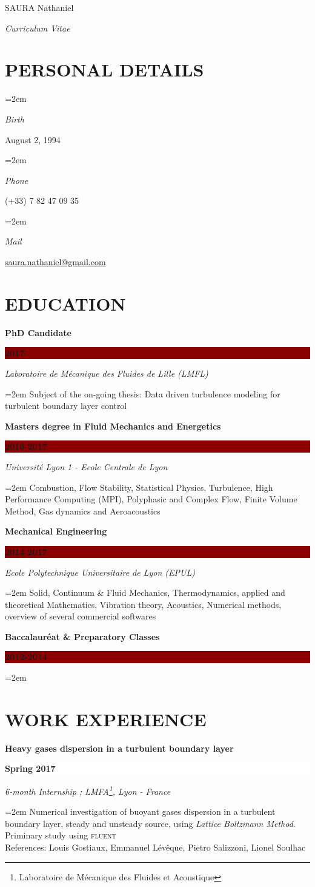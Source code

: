 \documentclass[paper=a4,fontsize=10pt]{scrartcl} %
\newcommand{\dred}{\color{dred}}
\newcommand{\bk}{\color{black}}
\newlength{\spacebox}
\newcommand{\sepspace}{\vspace*{1em}}		%
\newcommand{\MyName}[1]{ %
		\Huge \usefont{OT1}{phv}{b}{n} \hfill #1
		\par \normalsize \normalfont}
\newcommand{\MySlogan}[1]{ %
		\large \usefont{OT1}{phv}{m}{n}\hfill \textit{#1}
		\par \normalsize \normalfont}
\newcommand{\NewPart}[1]{\section*{\uppercase{#1}}}
\newcommand{\PersonalEntry}[2]{
		\noindent\hangindent=2em\hangafter=0 %
		\parbox{\spacebox}{        %
		\textit{#1}}		       %
		\hspace{1.5em} #2 \par}    %
\newcommand{\EducationEntry}[4]{
		\noindent \textbf{#1} \hfill      %
		\colorbox{DarkRed}{%
			\parbox{6em}{%
			\hfill\color{White}#2}} \par  %
		\noindent \textit{#3} \par        %
		\noindent\hangindent=2em\hangafter=0 \small #4 %
		\normalsize \par}
\newcommand{\EducationEntrie}[4]{
		\noindent \textbf{#1} \hfill      %
		\colorbox{white}{%
			\parbox{10em}{%
			\hfill\dred#2 }} \par  %
		\noindent \textit{#3} \par        %
		\noindent\hangindent=2em\hangafter=0 \small #4 %
		\normalsize \par}
\begin{document}

\MyName{\dred SAURA \bk Nathaniel}
\MySlogan{Curriculum \dred Vitae \bk}


\NewPart{Personal details}{} \bk

\PersonalEntry{Birth}{August 2, 1994}
\PersonalEntry{Phone}{(+33) 7 82 47 09 35}
\PersonalEntry{Mail}{\href{mailto:saura.nathaniel@gmail.com}{saura.nathaniel@gmail.com}} \bk

\NewPart{Education}{}
\EducationEntry{PhD Candidate}{\textbf{2017-}}{Laboratoire de Mécanique des Fluides de Lille (LMFL)}{Subject of the on-going thesis: Data driven turbulence modeling for turbulent boundary layer control}
\sepspace

\EducationEntry{Masters degree in Fluid Mechanics and Energetics}{\textbf{2016-2017}}{Université Lyon 1 - Ecole Centrale de Lyon}{Combustion, Flow Stability, Statistical Physics, Turbulence, High Performance Computing (MPI), Polyphasic and Complex Flow, Finite Volume Method, Gas dynamics and Aeroacoustics}
\sepspace

\EducationEntry{Mechanical Engineering}{\textbf{2014-2017}}{Ecole Polytechnique Universitaire de Lyon (EPUL)}{Solid, Continuum \& Fluid Mechanics, Thermodynamics, applied and theoretical Mathematics, Vibration theory, Acoustics, Numerical methods, overview of several commercial softwares}
\sepspace

\EducationEntry{Baccalauréat \& Preparatory Classes}{\textbf{2012-2014}}{}{}
\vspace{-0.7cm}
\NewPart{Work experience}{}

\EducationEntrie{Heavy gases dispersion in a turbulent boundary layer}{\textbf{Spring 2017}}{6-month Internship ; LMFA\footnote{\label{note1}Laboratoire de Mécanique des Fluides et Acoustique}, Lyon - France}{Numerical investigation of buoyant gases dispersion in a turbulent boundary layer, steady and unsteady source, using \textit{Lattice Boltzmann Method}. Priminary study using \textsc{fluent}\\ \footnotesize{References: Louis Gostiaux, Emmanuel Lévêque, Pietro Salizzoni, Lionel Soulhac}}
\sepspace
\end{document}
